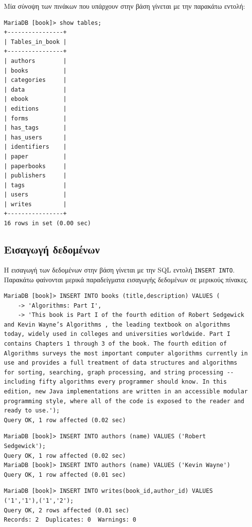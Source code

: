 \documentclass{assignment}
\begin{document}
Μία σύνοψη των πινάκων που υπάρχουν στην βάση γίνεται με την παρακάτω εντολή:

\begin{verbatim}
MariaDB [book]> show tables;
+----------------+
| Tables_in_book |
+----------------+
| authors        |
| books          |
| categories     |
| data           |
| ebook          |
| editions       |
| forms          |
| has_tags       |
| has_users      |
| identifiers    |
| paper          |
| paperbooks     |
| publishers     |
| tags           |
| users          |
| writes         |
+----------------+
16 rows in set (0.00 sec)
\end{verbatim}

\subsection{Εισαγωγή δεδομένων}

Η εισαγωγή των δεδομένων στην βάση γίνεται με την SQL εντολή \texttt{INSERT INTO}. Παρακάτω φαίνονται μερικά παραδείγματα εισαγωγής δεδομένων σε μερικούς πίνακες.

\begin{verbatim}
MariaDB [book]> INSERT INTO books (title,description) VALUES ( 
    -> 'Algorithms: Part I', 
    -> 'This book is Part I of the fourth edition of Robert Sedgewick and Kevin Wayne’s Algorithms , the leading textbook on algorithms today, widely used in colleges and universities worldwide. Part I contains Chapters 1 through 3 of the book. The fourth edition of Algorithms surveys the most important computer algorithms currently in use and provides a full treatment of data structures and algorithms for sorting, searching, graph processing, and string processing -- including fifty algorithms every programmer should know. In this edition, new Java implementations are written in an accessible modular programming style, where all of the code is exposed to the reader and ready to use.');
Query OK, 1 row affected (0.02 sec)
\end{verbatim}

\begin{verbatim}
MariaDB [book]> INSERT INTO authors (name) VALUES ('Robert Sedgewick');
Query OK, 1 row affected (0.02 sec)
MariaDB [book]> INSERT INTO authors (name) VALUES ('Kevin Wayne')
Query OK, 1 row affected (0.01 sec)
\end{verbatim}

\begin{verbatim}
MariaDB [book]> INSERT INTO writes(book_id,author_id) VALUES ('1','1'),('1','2');
Query OK, 2 rows affected (0.01 sec)
Records: 2  Duplicates: 0  Warnings: 0
\end{verbatim}
\end{document}
